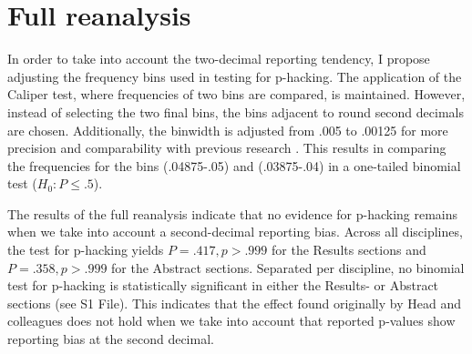 \section*{Full reanalysis}
In order to take into account the two-decimal reporting tendency, I propose adjusting the frequency bins used in testing for p-hacking. The application of the Caliper test, where frequencies of two bins are compared, is maintained. However, instead of selecting the two final bins, the bins adjacent to round second decimals are chosen. Additionally, the binwidth is adjusted from .005 to .00125 for more precision and comparability with previous research \cite{Masicampo2012, Leggett2013}. This results in comparing the frequencies for the bins (.04875-.05) and (.03875-.04) in a one-tailed binomial test ($H_0: P \leq .5$).

The results of the full reanalysis indicate that no evidence for p-hacking remains when we take into account a second-decimal reporting bias. Across all disciplines, the test for p-hacking yields $P=.417,p>.999$ for the Results sections and $P=.358,p>.999$ for the Abstract sections. Separated per discipline, no binomial test for p-hacking is statistically significant in either the Results- or Abstract sections (see S1 File). This indicates that the effect found originally by Head and colleagues does not hold when we take into account that reported p-values show reporting bias at the second decimal.
  